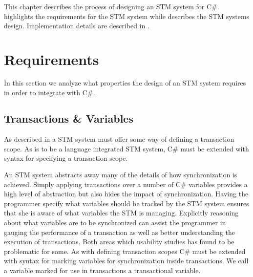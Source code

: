 \makeatletter {}\makeatother
{}
This chapter describes the process of designing an \ac{STM} system for C\#.  highlights the requirements for the \ac{STM} system while  describes the \ac{STM} systems design. Implementation details are described in .
\label{chap:stm_design}
\section{Requirements}
\label{sec:stm_requirements}
In this section we analyze what properties the design of an \ac{STM} system requires in order to integrate with C\#.
\subsection{Transactions \& Variables}
\label{subsec:rec_transactions_variables}
As described in  a \ac{STM} system must offer some way of defining a transaction scope. As \stmnamesp is to be a language integrated \ac{STM} system, C\# must be extended with syntax for specifying a transaction scope.

An \ac{STM} system abstracts away many of the details of how synchronization is achieved. Simply applying transactions over a number of C\# variables provides a high level of abstraction but also hides the impact of synchronization. Having the programmer specify what variables should be tracked by the \ac{STM} system ensures that she is aware of what variables the \ac{STM} is managing. Explicitly reasoning about what variables are to be synchronized can assist the programmer in gauging the performance of a transaction as well as better understanding the execution of transactions. Both areas which usability studies\cite{rossbach2010transactional}\cite{pankratius2009does} has found to be problematic for some. As with defining transaction scopes C\# must be extended with syntax for marking variables for synchronization inside transactions. We call a variable marked for use in transactions a transactional variable.

